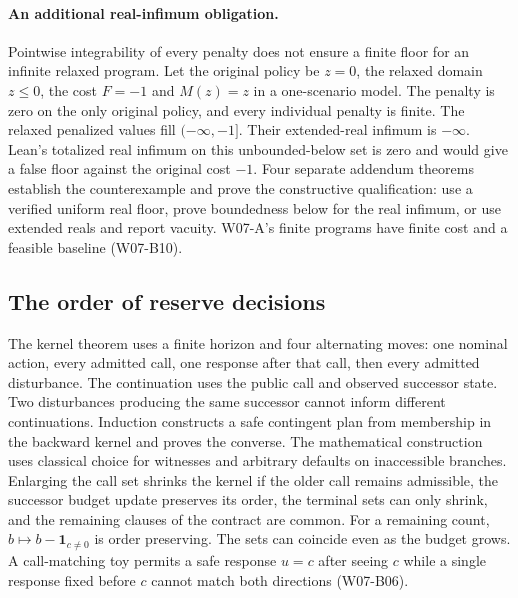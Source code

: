 \documentclass[11pt,letterpaper]{article}
\begin{document}
\paragraph{An additional real-infimum obligation.}
Pointwise integrability of every penalty does not ensure a finite floor for an infinite relaxed program. Let the original policy be $z=0$, the relaxed domain $z\le0$, the cost $F=-1$ and $M(z)=z$ in a one-scenario model. The penalty is zero on the only original policy, and every individual penalty is finite. The relaxed penalized values fill $(-\infty,-1]$. Their extended-real infimum is $-\infty$. Lean's totalized real infimum on this unbounded-below set is zero and would give a false floor against the original cost $-1$. Four separate addendum theorems establish the counterexample and prove the constructive qualification: use a verified uniform real floor, prove boundedness below for the real infimum, or use extended reals and report vacuity. W07-A's finite programs have finite cost and a feasible baseline (W07-B10).

\subsection{The order of reserve decisions}
The kernel theorem uses a finite horizon and four alternating moves: one nominal action, every admitted call, one response after that call, then every admitted disturbance. The continuation uses the public call and observed successor state. Two disturbances producing the same successor cannot inform different continuations. Induction constructs a safe contingent plan from membership in the backward kernel and proves the converse. The mathematical construction uses classical choice for witnesses and arbitrary defaults on inaccessible branches. Enlarging the call set shrinks the kernel if the older call remains admissible, the successor budget update preserves its order, the terminal sets can only shrink, and the remaining clauses of the contract are common. For a remaining count, $b\mapsto b-\mathbf{1}_{c\ne0}$ is order preserving. The sets can coincide even as the budget grows. A call-matching toy permits a safe response $u=c$ after seeing $c$ while a single response fixed before $c$ cannot match both directions (W07-B06).
\end{document}
